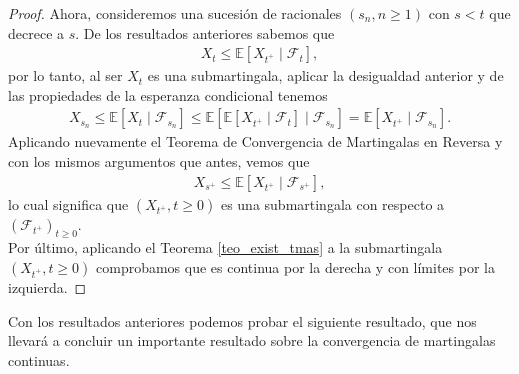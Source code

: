 \begin{proof}
Ahora, consideremos una sucesión de racionales $(s_n, n \geq 1)$ con $s < t$ que decrece a $s$. De los resultados anteriores sabemos que 
\begin{align*}
X_t \leq \mathbb{E} [X_{t^{+}} \mid \mathcal{F}_t], 
\end{align*}
por lo tanto, al ser $X_t$ es una submartingala, aplicar la desigualdad anterior y de las propiedades de la esperanza condicional tenemos
\begin{align*}
	X_{s_n} \leq \mathbb{E} [X_t \mid \mathcal{F}_{s_n}] \leq \mathbb{E} [\mathbb{E}[X_{t^{+}} \mid \mathcal{F}_t] \mid \mathcal{F}_{s_n}] = \mathbb{E}[X_{t^{+}} \mid \mathcal{F}_{s_n}].
\end{align*}
Aplicando nuevamente el Teorema de Convergencia de Martingalas en Reversa y con los mismos argumentos que antes, vemos que
\begin{align*}
	X_{s^{+}} \leq \mathbb{E}[X_{t^{+}} \mid \mathcal{F}_{s^{+}}],
\end{align*}
lo cual significa que $(X_{t^{+}}, t \geq 0)$ es una submartingala con respecto a $(\mathcal{F}_{t^{+}})_{t \geq 0}$. \\

Por último, aplicando el Teorema \ref{teo_exist_tmas} a la submartingala $(X_{t^{+}}, t \geq 0)$ comprobamos que es continua por la derecha y con límites por la izquierda.
\end{proof}

Con los resultados anteriores podemos probar el siguiente resultado, que nos llevará a concluir un importante resultado sobre la convergencia de martingalas continuas. 

